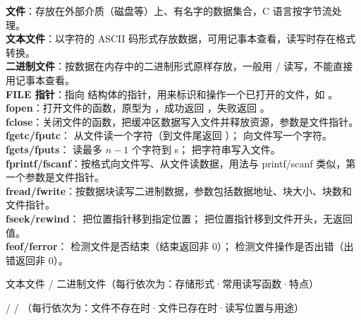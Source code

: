 \documentclass[a4paper,11pt]{article}
\begin{document}
\begin{keyterms}
\textbf{文件}：存放在外部介质（磁盘等）上、有名字的数据集合，C 语言按字节流处理。\\
\textbf{文本文件}：以字符的 ASCII 码形式存放数据，可用记事本查看，读写时存在格式转换。\\
\textbf{二进制文件}：按数据在内存中的二进制形式原样存放，一般用 / 读写，不能直接用记事本查看。\\
\textbf{FILE 指针}：指向  结构体的指针，用来标识和操作一个已打开的文件，如 。\\
\textbf{fopen}：打开文件的函数，原型为 ，成功返回 ，失败返回 。\\
\textbf{fclose}：关闭文件的函数，把缓冲区数据写入文件并释放资源，参数是文件指针。\\
\textbf{fgetc/fputc}： 从文件读一个字符（到文件尾返回 ）； 向文件写一个字符。\\
\textbf{fgets/fputs}： 读最多 $n-1$ 个字符到 s； 把字符串写入文件。\\
\textbf{fprintf/fscanf}：按格式向文件写、从文件读数据，用法与 printf/scanf 类似，第一个参数是文件指针。\\
\textbf{fread/fwrite}：按数据块读写二进制数据，参数包括数据地址、块大小、块数和文件指针。\\
\textbf{fseek/rewind}： 把位置指针移到指定位置； 把位置指针移到文件开头，无返回值。\\
\textbf{feof/ferror}： 检测文件是否结束（结束返回非 0）； 检测文件操作是否出错（出错返回非 0）。
\end{keyterms}

\begin{contrast}{文本文件 / 二进制文件（每行依次为：存储形式·常用读写函数·特点）}
\end{contrast}

\begin{contrast}{ /  / （每行依次为：文件不存在时·文件已存在时·读写位置与用途）}
\end{contrast}
\end{document}
